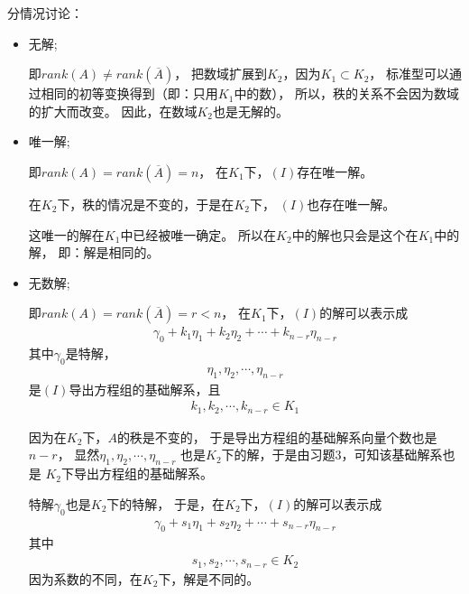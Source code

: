 \documentclass{article}
\begin{document}
分情况讨论：
\begin{itemize}
  \item 无解;

        即$rank(A) \neq rank(\overline{A})$，
        把数域扩展到$K_2$，因为$K_1 \subset K_2$，
        标准型可以通过相同的初等变换得到（即：只用$K_1$中的数），
        所以，秩的关系不会因为数域的扩大而改变。
        因此，在数域$K_2$也是无解的。

  \item 唯一解;

        即$rank(A) = rank(\overline{A}) = n$，
        在$K_1$下，$(I)$存在唯一解。

        在$K_2$下，秩的情况是不变的，于是在$K_2$下，
        $(I)$也存在唯一解。

        这唯一的解在$K_1$中已经被唯一确定。
        所以在$K_2$中的解也只会是这个在$K_1$中的解，
        即：解是相同的。

  \item 无数解;

        即$rank(A) = rank(\overline{A}) = r < n$，
        在$K_1$下，$(I)$的解可以表示成
        \begin{align*}
          \gamma_0 + k_1 \eta_1 + k_2 \eta_2 + \cdots + k_{n - r} \eta_{n - r}
        \end{align*}
        其中$\gamma_0$是特解，
        \begin{align*}
          \eta_1, \eta_2, \cdots, \eta_{n - r}
        \end{align*}
        是$(I)$导出方程组的基础解系，且
        \begin{align*}
          k_1, k_2, \cdots, k_{n - r} \in K_1
        \end{align*}

        因为在$K_2$下，$A$的秩是不变的，
        于是导出方程组的基础解系向量个数也是$n - r$，
        显然$\eta_1, \eta_2, \cdots, \eta_{n - r}$
        也是$K_2$下的解，于是由习题3，可知该基础解系也是
        $K_2$下导出方程组的基础解系。

        特解$\gamma_0$也是$K_2$下的特解，
        于是，在$K_2$下，$(I)$的解可以表示成
        \begin{align*}
          \gamma_0 + s_1 \eta_1 + s_2 \eta_2 + \cdots + s_{n - r} \eta_{n - r}
        \end{align*}
        其中
        \begin{align*}
          s_1, s_2, \cdots, s_{n - r} \in K_2
        \end{align*}
        因为系数的不同，在$K_2$下，解是不同的。
\end{itemize}
\end{document}
